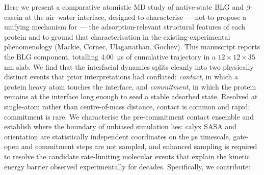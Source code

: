 \documentclass[11pt,a4paper]{article}
\begin{document}
Here we present a comparative atomistic MD study of native-state BLG and
$\beta$-casein at the air--water interface, designed to characterise --- not
to propose a unifying mechanism for --- the adsorption-relevant structural
features of each protein and to ground that characterisation in the
existing experimental phenomenology (Mackie, Cornec, Ulaganathan, Gochev).
This manuscript reports the BLG component, totalling \SI{4.00}{\micro\second} of
cumulative trajectory in a $12\times12\times35$\,\si{\nano\metre} slab. We find that
the interfacial dynamics splits cleanly into two physically distinct events
that prior interpretations had conflated: \emph{contact}, in which a
protein heavy atom touches the interface, and \emph{commitment}, in which
the protein remains at the interface long enough to seed a stable
adsorbed state. Resolved at single-atom rather than centre-of-mass
distance, contact is common and rapid; commitment is rare. We characterise the
pre-commitment contact ensemble and establish where the boundary of
unbiased simulation lies: calyx SASA and orientation are statistically
independent coordinates on the \si{\micro\second} timescale, gate-open
and commitment steps are not sampled, and enhanced sampling is required
to resolve the candidate rate-limiting molecular events that explain the
kinetic energy barrier observed experimentally for decades. Specifically,
we contribute:
\end{document}
